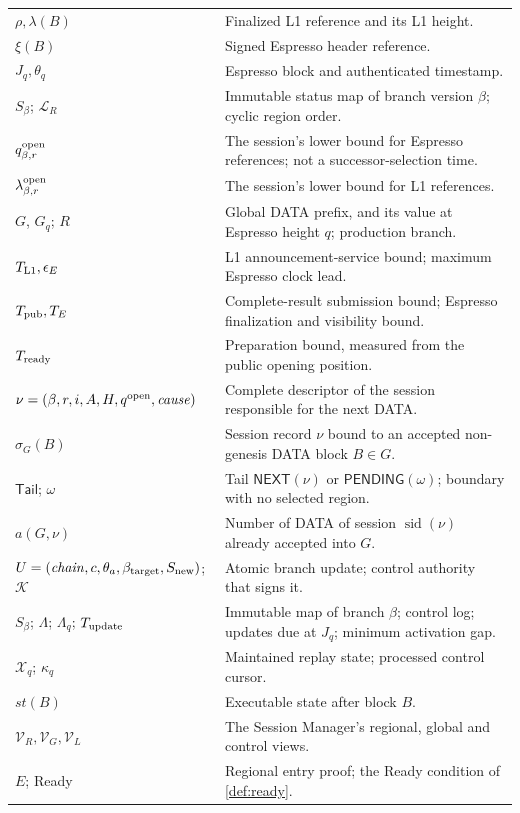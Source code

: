 \documentclass[11pt,a4paper]{article}
\newcommand{\tagg}[1]{\ensuremath{\mathsf{#1}}}
\begin{document}
\begin{table}[htbp]
\begin{tabularx}{\linewidth}{@{}p{.32\linewidth}Y@{}}
$\rho,\lambda(B)$ & Finalized L1 reference and its L1 height.\\
$\xi(B)$ & Signed Espresso header reference.\\
$J_q,\theta_q$ & Espresso block and authenticated timestamp.\\
$S_\beta$; $\mathcal L_R$ & Immutable status map of branch version $\beta$; cyclic region order.\\
$q_{\beta,r}^{\rm open}$ & The session's lower bound for Espresso references; not a successor-selection time.\\
$\lambda_{\beta,r}^{\rm open}$ & The session's lower bound for L1 references.\\
$G$, $G_q$; $R$ & Global DATA prefix, and its value at Espresso height $q$; production branch.\\
$T_{\rm L1},\epsilon_E$ & L1 announcement-service bound; maximum Espresso clock lead.\\
$T_{\rm pub},T_E$ & Complete-result submission bound; Espresso finalization and visibility bound.\\
$T_{\rm ready}$ & Preparation bound, measured from the public opening position.\\
$\nu=(\beta,r,i,A,H,q^{\rm open},\mathit{cause})$ & Complete descriptor of the session responsible for the next DATA.\\
$\sigma_G(B)$ & Session record $\nu$ bound to an accepted non-genesis DATA block $B\in G$.\\
$\mathsf{Tail}$; $\omega$ & Tail $\tagg{NEXT}(\nu)$ or $\tagg{PENDING}(\omega)$; boundary with no selected region.\\
$a(G,\nu)$ & Number of DATA of session $\operatorname{sid}(\nu)$ already accepted into $G$.\\
$U=(\mathit{chain},c,\theta_a,\beta_{\rm target},S_{\rm new})$; $\mathcal K$ & Atomic branch update; control authority that signs it.\\
$S_\beta$; $\Lambda$; $\Lambda_q$; $T_{\rm update}$ & Immutable map of branch $\beta$; control log; updates due at $J_q$; minimum activation gap.\\
$\mathcal X_q$; $\kappa_q$ & Maintained replay state; processed control cursor.\\
$\mathit{st}(B)$ & Executable state after block $B$.\\
$\mathcal V_R,\mathcal V_G,\mathcal V_L$ & The Session Manager's regional, global and control views.\\
$E$; Ready & Regional entry proof; the Ready condition of \cref{def:ready}.\\
\bottomrule\end{tabularx}
\end{table}
\end{document}
